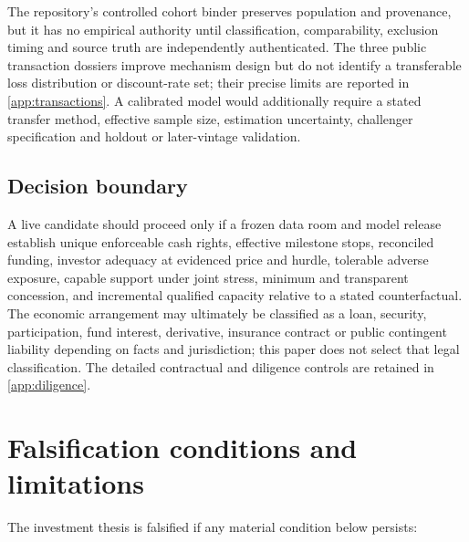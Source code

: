 \documentclass[11pt,a4paper]{article}
\begin{document}
The repository's controlled cohort binder preserves population and provenance, but it has no empirical authority until classification, comparability, exclusion timing and source truth are independently authenticated. The three public transaction dossiers improve mechanism design but do not identify a transferable loss distribution or discount-rate set; their precise limits are reported in \cref{app:transactions}. A calibrated model would additionally require a stated transfer method, effective sample size, estimation uncertainty, challenger specification and holdout or later-vintage validation.

\subsection{Decision boundary}

A live candidate should proceed only if a frozen data room and model release establish unique enforceable cash rights, effective milestone stops, reconciled funding, investor adequacy at evidenced price and hurdle, tolerable adverse exposure, capable support under joint stress, minimum and transparent concession, and incremental qualified capacity relative to a stated counterfactual. The economic arrangement may ultimately be classified as a loan, security, participation, fund interest, derivative, insurance contract or public contingent liability depending on facts and jurisdiction; this paper does not select that legal classification. The detailed contractual and diligence controls are retained in \cref{app:diligence}.

\section{Falsification conditions and limitations}

The investment thesis is falsified if any material condition below persists:
\end{document}
